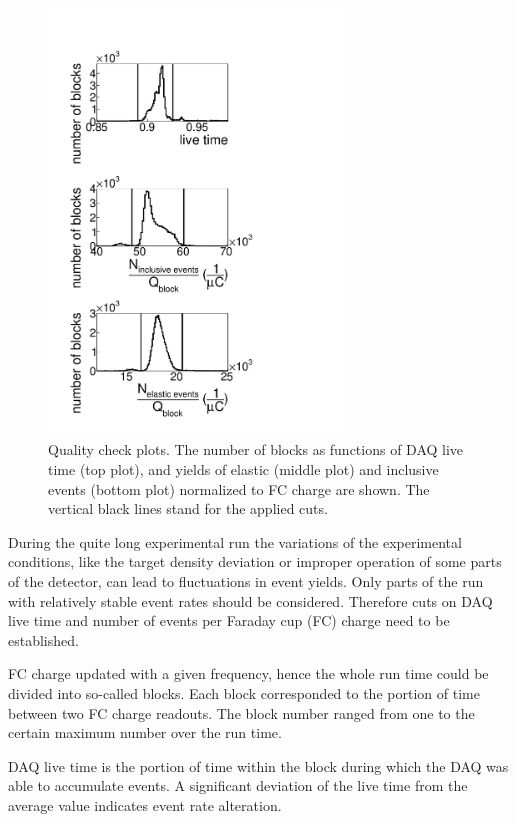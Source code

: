 \documentclass[prc,twocolumn,superscriptaddress,showpacs,amssymb,amsmath,amsfonts,linenumbers,aps]{revtex4-1}
\begin{document}
\begin{figure}[htp]
\begin{center}
 \includegraphics[width=8cm,keepaspectratio]{pictures/qcheck/qcheck1d.pdf} 
\vspace{-0.1cm}
\caption{Quality check plots. The number of blocks as functions of DAQ live time (top plot), and   yields of elastic (middle plot) and inclusive events (bottom plot) normalized to FC charge are shown. The vertical black  lines stand for the applied cuts.}
\label{fig:qcheck}
\end{center}
\end{figure} 


During the quite long experimental run the variations of the experimental conditions, like the target density deviation or improper operation of some parts of the detector, can lead to fluctuations in event yields.
 Only parts of the run with relatively stable event rates should be considered.
Therefore cuts on DAQ live time and number of events per Faraday cup (FC) charge need to be established. 

FC charge updated with a given frequency, hence the whole run time could be divided into so-called blocks. Each block corresponded to the portion of time between two FC charge readouts. The block number ranged from one to the certain maximum number over the run time. 


DAQ live time is the portion of time within the block during which the DAQ was able to accumulate events. A significant deviation of the live time from the average value indicates event rate alteration. 
\end{document}
